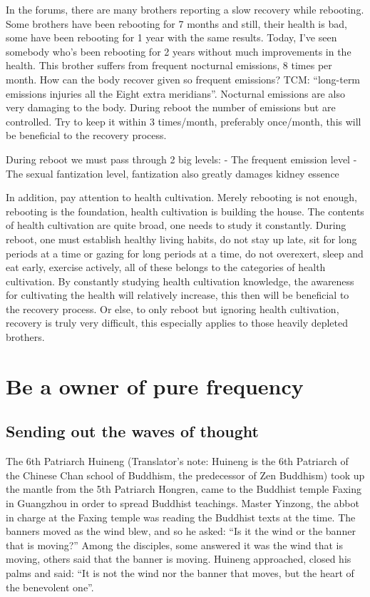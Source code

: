 \documentclass[
]{book}
\begin{document}
In the forums, there are many brothers reporting a slow recovery while rebooting. Some brothers have been rebooting for 7 months and still, their health is bad, some have been rebooting for 1 year with the same results. Today, I've seen somebody who's been rebooting for 2 years without much improvements in the health. This brother suffers from frequent nocturnal emissions, 8 times per month. How can the body recover given so frequent emissions? TCM: ``long-term emissions injuries all the Eight extra meridians''. Nocturnal emissions are also very damaging to the body. During reboot the number of emissions but are controlled. Try to keep it within 3 times/month, preferably once/month, this will be beneficial to the recovery process.

During reboot we must pass through 2 big levels:
- The frequent emission level
- The sexual fantization level, fantization also greatly damages kidney essence

In addition, pay attention to health cultivation. Merely rebooting is not enough, rebooting is the foundation, health cultivation is building the house. The contents of health cultivation are quite broad, one needs to study it constantly. During reboot, one must establish healthy living habits, do not stay up late, sit for long periods at a time or gazing for long periods at a time, do not overexert, sleep and eat early, exercise actively, all of these belongs to the categories of health cultivation. By constantly studying health cultivation knowledge, the awareness for cultivating the health will relatively increase, this then will be beneficial to the recovery process. Or else, to only reboot but ignoring health cultivation, recovery is truly very difficult, this especially applies to those heavily depleted brothers.

\hypertarget{be-a-owner-of-pure-frequency}{%
\chapter{Be a owner of pure frequency}\label{be-a-owner-of-pure-frequency}}

\hypertarget{sending-out-the-waves-of-thought}{%
\section{Sending out the waves of thought}\label{sending-out-the-waves-of-thought}}

The 6th Patriarch Huineng (Translator's note: Huineng is the 6th Patriarch of the Chinese Chan school of Buddhism, the predecessor of Zen Buddhism) took up the mantle from the 5th Patriarch Hongren, came to the Buddhist temple Faxing in Guangzhou in order to spread Buddhist teachings. Master Yinzong, the abbot in charge at the Faxing temple was reading the Buddhist texts at the time. The banners moved as the wind blew, and so he asked: ``Is it the wind or the banner that is moving?'' Among the disciples, some answered it was the wind that is moving, others said that the banner is moving. Huineng approached, closed his palms and said: ``It is not the wind nor the banner that moves, but the heart of the benevolent one''.
\end{document}
